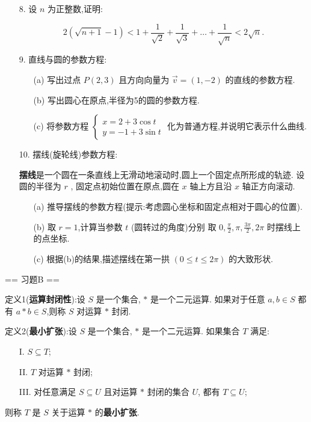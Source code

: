 \begin{enumerate}
    \item[8.]设 $n$ 为正整数,证明:

    \[2(\sqrt{n + 1} -1)< 1 + \frac{1}{\sqrt{2}} +\frac{1}{\sqrt{3}} 
    +\dots +\frac{1}{\sqrt{n}} < 2\sqrt{n}.\]

    \item[9.]直线与圆的参数方程:

    \begin{enumerate}
    \item[(a)]写出过点 $P(2,3)$ 且方向向量为 $\vec{v} = (1, - 2)$ 的直线的参数方程.
    \item[(b)]写出圆心在原点,半径为5的圆的参数方程.
    \item[(c)]将参数方程 $\left\{ \begin{array}{l}x = 2 + 3\cos t \\ 
        y = -1 + 3\sin t \end{array} \right.$ 化为普通方程,并说明它表示什么曲线.
    \end{enumerate}

    \item[10.]摆线(旋轮线)参数方程:
    
    \textbf{摆线}是一个圆在一条直线上无滑动地滚动时,圆上一个固定点所形成的轨迹. 设圆的半径为 $r$ ,
    固定点初始位置在原点,圆在 $x$ 轴上方且沿 $x$ 轴正方向滚动.

    \begin{enumerate}
    \item[(a)]推导摆线的参数方程(提示:考虑圆心坐标和固定点相对于圆心的位置).
    \item[(b)]取 $r = 1$,计算当参数 $t$ (圆转过的角度)分别
        取 $\displaystyle 0,\frac{\pi}{2},\pi ,\frac{3\pi}{2},2\pi$ 时摆线上的点坐标.
    \item[(c)]根据(b)的结果,描述摆线在第一拱 $(0\leq t\leq 2\pi)$ 的大致形状.
    \end{enumerate}

\end{enumerate}

== 习题B ==

定义1(\textbf{运算封闭性}):设 $S$ 是一个集合, $*$ 是一个二元运算.
如果对于任意 $a,b\in S$ 都有 $a*b\in S$,则称 $S$ 对运算 $*$ 封闭.

定义2(\textbf{最小扩张}):设 $S$ 是一个集合, $*$ 是一个二元运算.
如果集合 $T$ 满足:
\begin{enumerate}
    \item[I.]$S\subseteq T$;
    \item[II.]$T$ 对运算 $*$ 封闭;
    \item[III.]对任意满足 $S\subseteq U$ 且对运算 $*$ 封闭的集合 $U$,
    都有 $T\subseteq U$;
\end{enumerate}
则称 $T$ 是 $S$ 关于运算 $*$ 的\textbf{最小扩张}.

